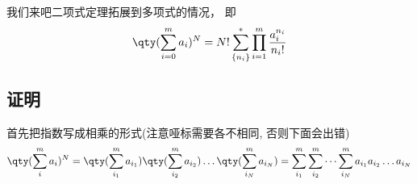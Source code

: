 

我们来吧二项式定理拓展到多项式的情况， 即
\begin{equation}
\qty(\sum_{i = 0}^m a_i)^N = N! \sum_{\{n_i\}}^* \prod_{i = 1}^m \frac{a_i^{n_i}}{n_i!}
\end{equation}

\subsection{证明}
首先把指数写成相乘的形式(注意哑标需要各不相同, 否则下面会出错)
\begin{equation}
\qty(\sum_i^m a_i)^N = \qty(\sum_{i_1}^m a_{i_1})\qty(\sum_{i_2}^m a_{i_2})\dots \qty(\sum_{i_N}^m a_{i_N}) = \sum_{i_1}^m \sum_{i_2}^m\dots \sum_{i_N}^m a_{i_1} a_{i_2}\dots a_{i_N}
\end{equation}

